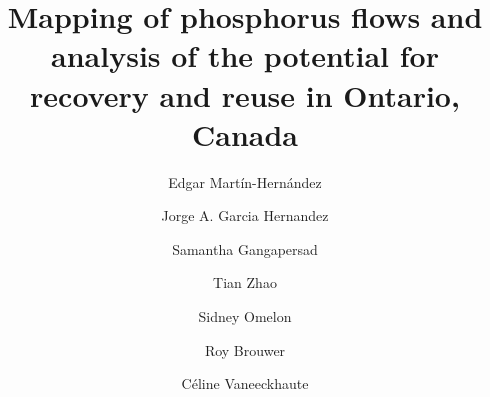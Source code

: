 \documentclass[]{elsarticle}
\begin{document}
\begin{frontmatter}
	\title{
	Mapping of phosphorus flows and analysis of the potential for recovery and reuse in Ontario, Canada
	}
	
	\author[ULaval]{Edgar Martín-Hernández}
	\author[Waterloo]{Jorge A. Garcia Hernandez}
	\author[McGill]{Samantha Gangapersad}
	\author[McGill]{Tian Zhao}
	\author[McGill]{Sidney Omelon}
	\author[Waterloo,TheWaterInstitute]{Roy Brouwer}
	\author[ULaval,CentrEau]{Céline Vaneeckhaute}
		
	\address[ULaval]{BioEngine - Research Team on Green Process Engineering and Biorefineries, Chemical Engineering Department, Université Laval, 1065 Ave. de la Médecine, Québec, QC, G1V 0A6, Canada}
	\address[CentrEau]{CentrEau, Centre de recherche sur l'eau, Université Laval, 1065 Avenue de la Médecine, Québec, QC, G1V 0A6, Canada}
	\address[McGill]{Department of Mining and Materials	Engineering, McGill University, Montréal, Canada}
	\address[Waterloo]{Department of Economics, University of Waterloo, 200 University Avenue West, Waterloo, ON, N2L 3G1, Canada}
	\address[TheWaterInstitute]{The Water Institute, University of Waterloo, 200 University Avenue West, Waterloo, ON, N2L 3G1, Canada}
	

\end{frontmatter}
\end{document}
